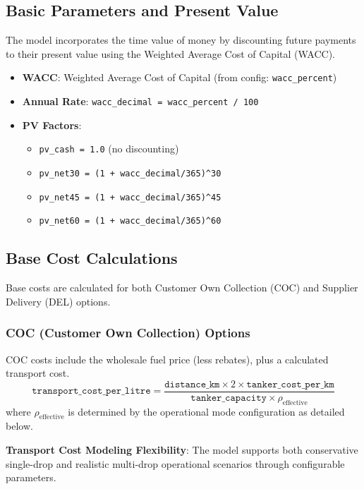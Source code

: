 \subsection{Basic Parameters and Present Value}
The model incorporates the time value of money by discounting future payments to their present value using the Weighted Average Cost of Capital (WACC).

\begin{itemize}
    \item \textbf{WACC}: Weighted Average Cost of Capital (from config: \texttt{wacc\_percent})
    \item \textbf{Annual Rate}: \texttt{wacc\_decimal = wacc\_percent / 100}
    \item \textbf{PV Factors}:
    \begin{itemize}
        \item \texttt{pv\_cash = 1.0} (no discounting)
        \item \texttt{pv\_net30 = (1 + wacc\_decimal/365)\^{}30}
        \item \texttt{pv\_net45 = (1 + wacc\_decimal/365)\^{}45}
        \item \texttt{pv\_net60 = (1 + wacc\_decimal/365)\^{}60}
    \end{itemize}
\end{itemize}

\subsection{Base Cost Calculations}
Base costs are calculated for both Customer Own Collection (COC) and Supplier Delivery (DEL) options.

\subsubsection{COC (Customer Own Collection) Options}
COC costs include the wholesale fuel price (less rebates), plus a calculated transport cost.
\begin{equation}
\texttt{transport\_cost\_per\_litre} = \frac{\texttt{distance\_km} \times 2 \times \texttt{tanker\_cost\_per\_km}}{\texttt{tanker\_capacity} \times \rho_{\text{effective}}}
\end{equation}
where $\rho_{\text{effective}}$ is determined by the operational mode configuration as detailed below.

\textbf{Transport Cost Modeling Flexibility}: The model supports both conservative single-drop and realistic multi-drop operational scenarios through configurable parameters.

